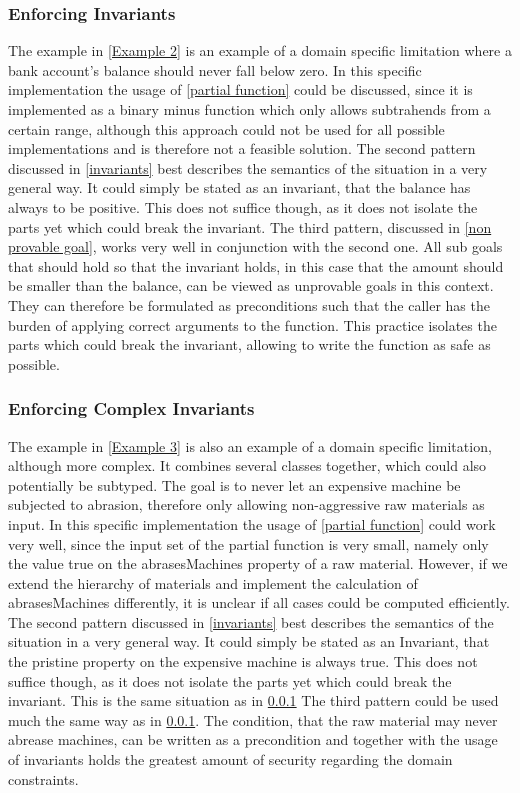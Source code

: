 \subsubsection{Enforcing Invariants} \label{Problem 2}
The example in \ref{Example 2} is an example of a domain specific limitation where a bank account's balance should never fall below zero. In this specific implementation the usage of \ref{partial function} could be discussed, since it is implemented as a binary minus function which only allows subtrahends from a certain range, although this approach could not be used for all possible implementations and is therefore not a feasible solution. \newline
The second pattern discussed in \ref{invariants} best describes the semantics of the situation in a very general way. It could simply be stated as an invariant, that the balance has always to be positive. This does not suffice though, as it does not isolate the parts yet which could break the invariant. \newline
The third pattern, discussed in \ref{non provable goal}, works very well in conjunction with the second one. All sub goals that should hold so that the invariant holds, in this case that the amount should be smaller than the balance, can be viewed as unprovable goals in this context. They can therefore be formulated as preconditions such that the caller has the burden of applying correct arguments to the function. This practice isolates the parts which could break the invariant, allowing to write the function as safe as possible.
\subsubsection{Enforcing Complex Invariants}
The example in \ref{Example 3} is also an example of a domain specific limitation, although more complex. It combines several classes together, which could also potentially be subtyped. The goal is to never let an expensive machine be subjected to abrasion, therefore only allowing non-aggressive raw materials as input. In this specific implementation the usage of \ref{partial function} could work very well, since the input set of the partial function is very small, namely only the value true on the abrasesMachines property of a raw material. However, if we extend the hierarchy of materials and implement the calculation of abrasesMachines differently, it is unclear if all cases could be computed efficiently. \newline
The second pattern discussed in \ref{invariants} best describes the semantics of the situation in a very general way. It could simply be stated as an Invariant, that the pristine property on the expensive machine is always true. This does not suffice though, as it does not isolate the parts yet which could break the invariant. This is the same situation as in \ref{Problem 2} \newline
The third pattern could be used much the same way as in \ref{Problem 2}. The condition, that the raw material may never abrease machines, can be written as a precondition and together with the usage of invariants holds the greatest amount of security regarding the domain constraints.

